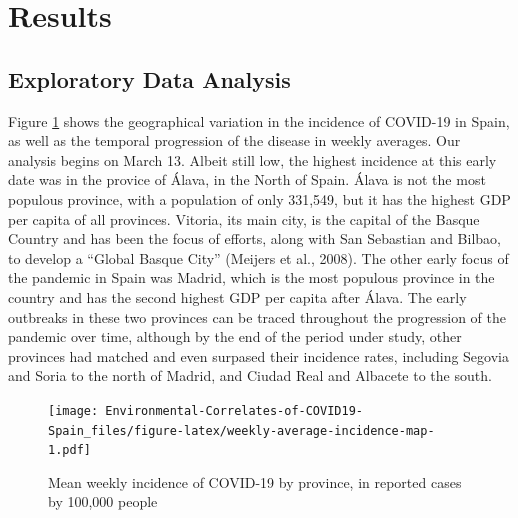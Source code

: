 \documentclass[]{elsarticle} %
\begin{document}
\hypertarget{results}{%
\section{Results}\label{results}}

\hypertarget{eda}{%
\subsection{Exploratory Data Analysis}\label{eda}}

Figure \ref{fig:weekly-average-incidence-map} shows the geographical
variation in the incidence of COVID-19 in Spain, as well as the temporal
progression of the disease in weekly averages. Our analysis begins on
March 13. Albeit still low, the highest incidence at this early date was
in the provice of Álava, in the North of Spain. Álava is not the most
populous province, with a population of only 331,549, but it has the
highest GDP per capita of all provinces. Vitoria, its main city, is the
capital of the Basque Country and has been the focus of efforts, along
with San Sebastian and Bilbao, to develop a ``Global Basque City''
(Meijers et al., 2008). The other early focus of the pandemic in Spain
was Madrid, which is the most populous province in the country and has
the second highest GDP per capita after Álava. The early outbreaks in
these two provinces can be traced throughout the progression of the
pandemic over time, although by the end of the period under study, other
provinces had matched and even surpased their incidence rates, including
Segovia and Soria to the north of Madrid, and Ciudad Real and Albacete
to the south.

\begin{figure}
\centering
\texttt{[image: Environmental-Correlates-of-COVID19-Spain\_files/figure-latex/weekly-average-incidence-map-1.pdf]}
\caption{\label{fig:weekly-average-incidence-map}Mean weekly incidence
of COVID-19 by province, in reported cases by 100,000 people}
\end{figure}
\end{document}
